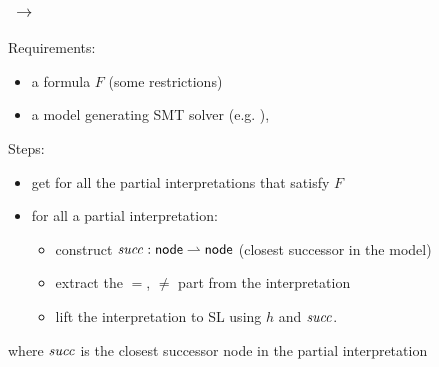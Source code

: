 \documentclass{beamer}
\begin{document}
\begin{frame}
  \frametitle{\LRJQ $\ \rightarrow \ $ \JoshLogic}

  Requirements:
  \begin{itemize}
  \item a \LRJQ formula $F$ (some restrictions)
  \item a model generating SMT solver (e.g. \zthree),
  \end{itemize}

  Steps:
  \begin{itemize}
  \item get for all the partial interpretations that satisfy $F$
  \item for all a partial interpretation:
  \begin{itemize}
  \item construct $\mathit{succ}: \mathsf{node} \rightharpoonup \mathsf{node}$ (closest successor in the model)
  \item extract the ${} = {}$, ${} \neq {}$ part from the interpretation
  \item lift the interpretation to SL using $h$ and $\mathit{succ}$.
  \end{itemize}
  \end{itemize}
  where $\mathit{succ}$ is the closest successor node in the partial interpretation

\end{frame}
\end{document}
